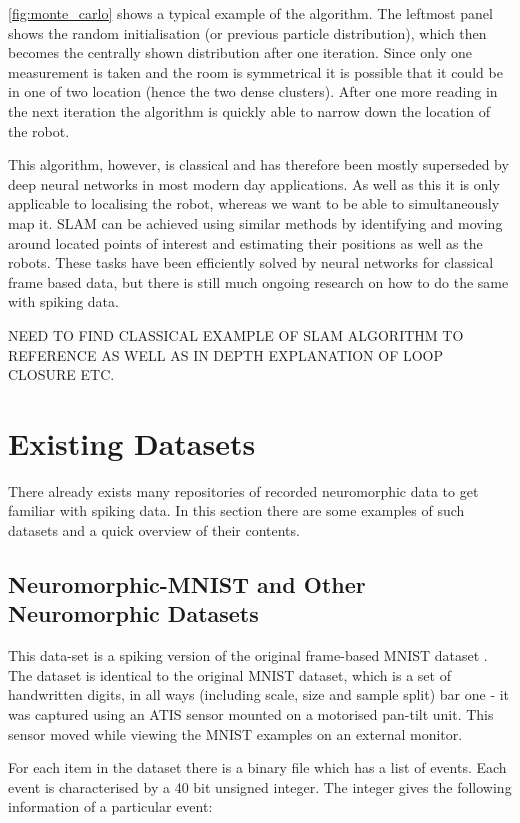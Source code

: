 \autoref{fig:monte_carlo} shows a typical example of the algorithm. The leftmost panel shows the random initialisation (or previous particle distribution), which then becomes the centrally shown distribution after one iteration. Since only one measurement is taken and the room is symmetrical it is possible that it could be in one of two location (hence the two dense clusters). After one more reading in the next iteration the algorithm is quickly able to narrow down the location of the robot.

This algorithm, however, is classical and has therefore been mostly superseded by deep neural networks in most modern day applications. As well as this it is only applicable to localising the robot, whereas we want to be able to simultaneously map it. SLAM can be achieved using similar methods by identifying and moving around located points of interest and estimating their positions as well as the robots. These tasks have been efficiently solved by neural networks for classical frame based data, but there is still much ongoing research on how to do the same with spiking data.

\color{red} NEED TO FIND CLASSICAL EXAMPLE OF SLAM ALGORITHM TO REFERENCE AS WELL AS IN DEPTH EXPLANATION OF LOOP CLOSURE ETC. \color{black}


\section{Existing Datasets}

There already exists many repositories of recorded neuromorphic data to get familiar with spiking data. In this section there are some examples of such datasets and a quick overview of their contents.

\subsection{Neuromorphic-MNIST and Other Neuromorphic Datasets}

This data-set is a spiking version of the original frame-based MNIST dataset \cite{MNIST}\cite{NMNIST}. The dataset is identical to the original MNIST dataset, which is a set of handwritten digits, in all ways (including scale, size and sample split) bar one - it was captured using an ATIS sensor mounted on a motorised pan-tilt unit. This sensor moved while viewing the MNIST examples on an external monitor.

For each item in the dataset there is a binary file which has a list of events. Each event is characterised by a 40 bit unsigned integer. The integer gives the following information of a particular event:

